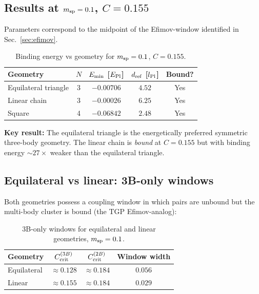 \subsection{Results at \texorpdfstring{$m_{\rm sp}=0.1$, $C=0.155$}{m=0.1, C=0.155}}

Parameters correspond to the midpoint of the Efimov-window identified
in Sec.~\ref{sec:efimov}.

\begin{table}[h]
\centering
\caption{Binding energy vs geometry for $m_{\rm sp}=0.1$, $C=0.155$.}
\label{tab:geometry}
\begin{tabular}{lcccc}
\hline
Geometry & $N$ & $E_{\rm min}$ [$E_{\rm Pl}$] & $d_{\rm ref}$ [$l_{\rm Pl}$] & Bound? \\
\hline
Equilateral triangle & 3 & $-0.00706$ & $4.52$ & Yes \\
Linear chain         & 3 & $-0.00026$ & $6.25$ & Yes \\
Square               & 4 & $-0.06842$ & $2.48$ & Yes \\
\hline
\end{tabular}
\end{table}

\noindent
\textbf{Key result:} The equilateral triangle is the energetically
preferred symmetric three-body geometry.  The linear chain is
\emph{bound} at $C=0.155$ but with binding energy $\sim27\times$ weaker
than the equilateral triangle.

\subsection{Equilateral vs linear: 3B-only windows}

Both geometries possess a coupling window in which pairs are unbound
but the multi-body cluster is bound (the TGP Efimov-analog):

\begin{table}[h]
\centering
\caption{3B-only windows for equilateral and linear geometries,
$m_{\rm sp}=0.1$.}
\label{tab:geom_windows}
\begin{tabular}{lccc}
\hline
Geometry & $C_{\rm crit}^{(3B)}$ & $C_{\rm crit}^{(2B)}$ & Window width \\
\hline
Equilateral & $\approx 0.128$ & $\approx 0.184$ & $0.056$ \\
Linear      & $\approx 0.155$ & $\approx 0.184$ & $0.029$ \\
\hline
\end{tabular}
\end{table}


